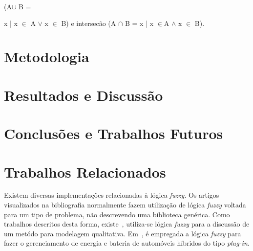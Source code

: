 \documentclass[12pt]{article}
\begin{document}
(A\begin{math} \cup \end{math} B ={ x | x \begin{math}\in \end{math} A \begin{math}\vee \end{math} x \begin{math}\in \end{math} B) e intersecão (A \begin{math} \cap \end{math} B = 
x | x \begin{math}\in \end{math}A \begin{math}\wedge \end{math} x \begin{math}\in \end{math} B).  



\section{\libname}
\label{sec:lib}

\section{Metodologia}
\label{sec:metodologia}	

\section{Resultados e Discussão}	
\label{sec:resultados}	

\section{Conclusões e Trabalhos Futuros}
\label{sec:conclusoes}	
	
\section{Trabalhos Relacionados}
\label{sec:trabalhos}

	Existem diversas implementações relacionadas à lógica \textit{fuzzy}. Os artigos visualizados na bibliografia normalmente fazem utilização de lógica \textit{fuzzy} voltada para um tipo de problema, não descrevendo uma biblioteca genérica. Como trabalhos descritos desta forma, existe~\cite{sugeno:93}, utiliza-se lógica \textit{fuzzy} para a discussão de um metódo para modelagem qualitativa. Em~\cite{li:11}, é empregada a lógica \textit{fuzzy} para fazer o gerenciamento de energia e bateria de automóveis híbridos do tipo \textit{plug-in}.
	
}
\end{document}
